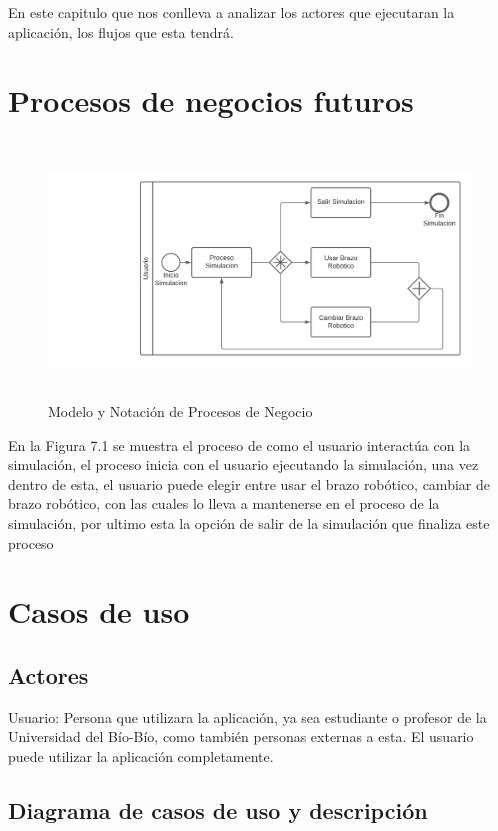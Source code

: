 En este capitulo que nos conlleva a analizar los actores que ejecutaran la aplicación, los flujos que esta tendrá.

\section{Procesos de negocios futuros}
\begin{figure}[h]
\centering
\includegraphics[height=6.83cm]{figures/bpmn.png}
\caption{Modelo y Notación de Procesos de Negocio}
\label{fig:bpmn}
\end{figure}

En la Figura 7.1 se muestra el proceso de como el usuario interactúa con la simulación, el proceso inicia con el usuario ejecutando la simulación, una vez dentro de esta, el usuario puede elegir entre usar el brazo robótico, cambiar de brazo robótico, con las cuales lo lleva a mantenerse en el proceso de la simulación, por ultimo esta la opción de salir de la simulación que finaliza este proceso

\section{Casos de uso}
\subsection{Actores}
Usuario: Persona que utilizara la aplicación, ya sea estudiante o profesor de la Universidad del Bío-Bío, como también personas externas a esta. El usuario puede utilizar la aplicación completamente.
\subsection{Diagrama de casos de uso y descripción}

